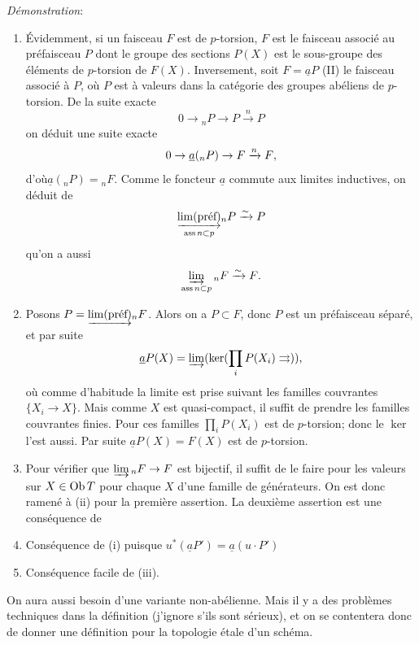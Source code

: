 \documentclass[10pt]{../fichiers-configuration-latex/smfart}
\begin{document}
\noindent
\emph{Démonstration}:
\begin{enumerate}
\renewcommand{\theenumi}{\roman{enumi}}
\renewcommand{\labelenumi}{(\theenumi)}
\item Évidemment, si un faisceau $F$ est de $p$-torsion, $F$ est le
  faisceau associé au préfaisceau $P$ dont le groupe des sections
  $P(X)$ est le sous-groupe des éléments de $p$-torsion de
  $F(X)$. Inversement, soit $F=\underline{a}P$ (II) le faisceau associé à $P$,
  où $P$ est à valeurs dans la catégorie des groupes abéliens de
  $p$-torsion. De la suite exacte
$$
0\rightarrow {}_nP \rightarrow P\xrightarrow{n}P
$$
on déduit une suite exacte
$$
0\rightarrow \underline{a}({}_nP)\rightarrow F\xrightarrow{n}F{},
$$
d'où\pageoriginale $\underline{a}({}_nP)={}_nF$. Comme le foncteur $\underline{a}$
commute aux limites inductives, on déduit de
$$
\underset{\operatorname{ass} n\subset p}{\underrightarrow{\lim(\text{\rm préf})}}{}_nP\xrightarrow{\sim}P
$$
qu'on a aussi
$$
\varinjlim_{\operatorname{ass} n\subset p} {}_nF\xrightarrow{\sim}F{}.
$$

\item Posons $P=\underrightarrow{\lim(\text{\rm préf})}{}_n F$. Alors on a
  $P\subset F$, donc $P$ est un préfaisceau séparé, et par suite
$$
\underline{a}P(X)=\varinjlim (\ker(\prod_i P(X_i)\rightrightarrows)){},
$$
où comme d'habitude la limite est prise suivant les familles
couvrantes $\{X_i\rightarrow X\}$. Mais comme $X$ est quasi-compact,
il suffit de prendre les familles couvrantes finies. Pour ces familles
$\prod_iP(X_i)$ est de $p$-torsion; donc le $\ker$ l'est aussi. Par
suite $\underline{a}P(X)=F(X)$ est de $p$-torsion.

\item Pour vérifier que $\varinjlim {}_nF\rightarrow F$ est bijectif,
  il suffit de le faire pour les valeurs sur $X\in \operatorname{Ob} T$ pour chaque
  $X$ d'une famille de générateurs. On est donc ramené à (ii) pour la
  première assertion. La deuxième assertion est une conséquence de

\item Conséquence de (i) puisque $u^{\ast}(\underline{a}P')=\underline{a}(u\cdot P')$

\item Conséquence facile de (iii).
\end{enumerate}

On aura aussi besoin d'une variante non-abélienne. Mais il y a des
problèmes techniques dans la définition (j'ignore s'ils sont sérieux),
et on se contentera donc de donner une définition pour la topologie
étale d'un schéma.
\end{document}
